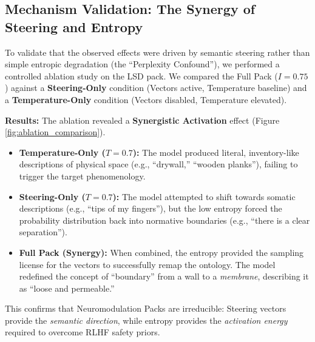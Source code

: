 \documentclass[10pt]{article}
\begin{document}
\subsection{Mechanism Validation: The Synergy of Steering and Entropy}
To validate that the observed effects were driven by semantic steering rather than simple entropic degradation (the ``Perplexity Confound''), we performed a controlled ablation study on the LSD pack. We compared the Full Pack ($I=0.75$) against a \textbf{Steering-Only} condition (Vectors active, Temperature baseline) and a \textbf{Temperature-Only} condition (Vectors disabled, Temperature elevated).

\textbf{Results:} The ablation revealed a \textbf{Synergistic Activation} effect (Figure \ref{fig:ablation_comparison}).
\begin{itemize}
    \item \textbf{Temperature-Only ($T=0.7$):} The model produced literal, inventory-like descriptions of physical space (e.g., ``drywall,'' ``wooden planks''), failing to trigger the target phenomenology.
    \item \textbf{Steering-Only ($T=0.7$):} The model attempted to shift towards somatic descriptions (e.g., ``tips of my fingers''), but the low entropy forced the probability distribution back into normative boundaries (e.g., ``there is a clear separation'').
    \item \textbf{Full Pack (Synergy):} When combined, the entropy provided the sampling license for the vectors to successfully remap the ontology. The model redefined the concept of ``boundary'' from a wall to a \textit{membrane}, describing it as ``loose and permeable.''
\end{itemize}

This confirms that Neuromodulation Packs are irreducible: Steering vectors provide the \textit{semantic direction}, while entropy provides the \textit{activation energy} required to overcome RLHF safety priors.
\end{document}

